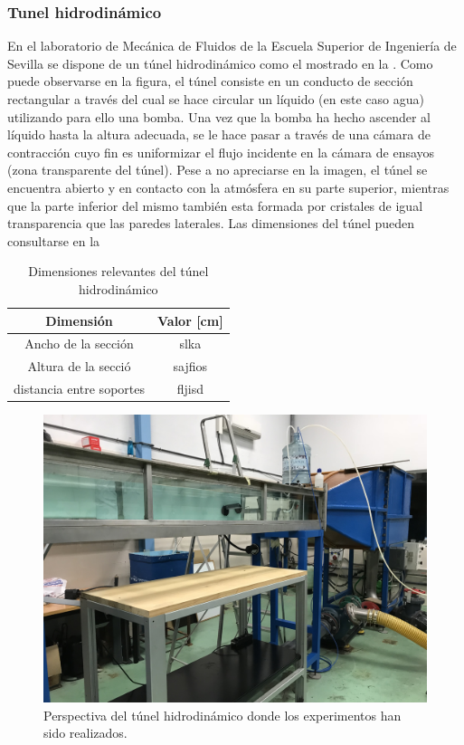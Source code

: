 \subsubsection*{Tunel hidrodinámico}

En el laboratorio de Mecánica de Fluidos de la Escuela Superior de Ingeniería de Sevilla se dispone de un túnel hidrodinámico como el mostrado en la . Como puede observarse en la figura, el túnel consiste en un conducto de sección rectangular a través del cual se hace circular un líquido (en este caso agua) utilizando para ello una bomba. Una vez que la bomba ha hecho ascender al líquido hasta la altura adecuada, se le hace pasar a través de una cámara de contracción cuyo fin es uniformizar el flujo incidente en la cámara de ensayos (zona transparente del túnel). Pese a no apreciarse en la imagen, el túnel se encuentra abierto  y en contacto con la atmósfera en su parte superior, mientras que la parte inferior del mismo también esta formada por cristales de igual transparencia que las paredes laterales. Las dimensiones del túnel pueden consultarse en la 

\begin{table}
\begin{tabular}{c c}
\textbf{Dimensión} & Valor [cm] \\
\hline \hline
Ancho de la sección & slka  \\
Altura de la secció & sajfios \\
distancia entre soportes & fljisd \\
\hline
\end{tabular}
\caption{Dimensiones relevantes del túnel hidrodinámico}
\end{table}

\begin{figure}
\includegraphics[scale=1]{ala2D/figuras/tunel.jpg}
\caption{Perspectiva del túnel hidrodinámico donde los experimentos han sido realizados.}
\end{figure}

